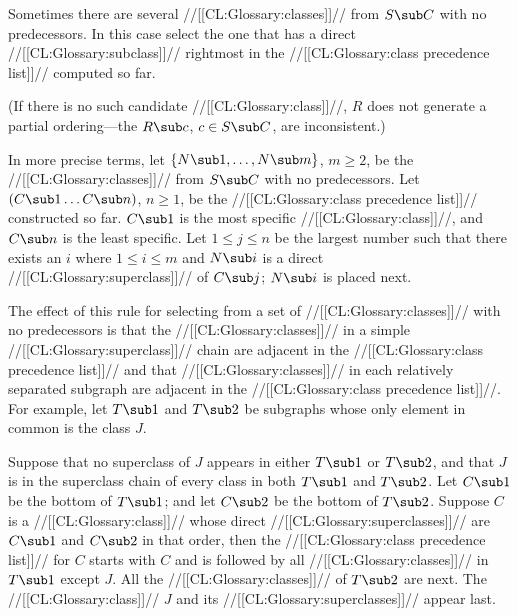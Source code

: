 Sometimes there are several //[[CL:Glossary:classes]]// from $S\sub C$ with no
predecessors.  In this case select the one that has a direct
//[[CL:Glossary:subclass]]// rightmost in the //[[CL:Glossary:class precedence list]]// computed so far.




(If there is no such candidate //[[CL:Glossary:class]]//, $R$ does not generate 
a partial ordering---the $R\sub c$, $c\in S\sub C$, are inconsistent.)

In more precise terms, let $\{N\sub 1,\ldots,N\sub m\}$, $m\geq 2$, be
the //[[CL:Glossary:classes]]// from $S\sub C$ with no predecessors.  Let $(C\sub
1\ldots C\sub n)$, $n\geq 1$, be the //[[CL:Glossary:class precedence list]]//
constructed so far.  $C\sub 1$ is the most specific //[[CL:Glossary:class]]//, and $C\sub
n$ is the least specific.  Let $1\leq j\leq n$ be the largest number
such that there exists an $i$ where $1\leq i\leq m$ and $N\sub i$
is a direct //[[CL:Glossary:superclass]]// of $C\sub j$; $N\sub i$ is placed next.


















The effect of this rule for selecting from a set of //[[CL:Glossary:classes]]// with no
predecessors is that the //[[CL:Glossary:classes]]// in a simple //[[CL:Glossary:superclass]]// chain are
adjacent in the //[[CL:Glossary:class precedence list]]// and that //[[CL:Glossary:classes]]// in each
relatively separated subgraph are adjacent in the //[[CL:Glossary:class precedence list]]//.
For example, let $T\sub 1$ and $T\sub 2$ be subgraphs whose only
element in common is the class $J$\negthinspace.




Suppose that no superclass of $J$ appears in either $T\sub 1$ or $T\sub 2$,
and that $J$ is in the superclass chain of every class in both $T\sub 1$ and $T\sub 2$.
    Let $C\sub 1$ be the bottom of $T\sub 1$; 
and let $C\sub 2$ be the bottom of $T\sub 2$.
Suppose $C$ is a //[[CL:Glossary:class]]// whose direct //[[CL:Glossary:superclasses]]//
are $C\sub 1$ and $C\sub 2$ in that order, then the //[[CL:Glossary:class precedence list]]//
for $C$ starts with $C$ and is followed by
all //[[CL:Glossary:classes]]// in $T\sub 1$ except $J$. 
All the //[[CL:Glossary:classes]]// of $T\sub 2$ are next.
The //[[CL:Glossary:class]]// $J$ and its //[[CL:Glossary:superclasses]]// appear last.

